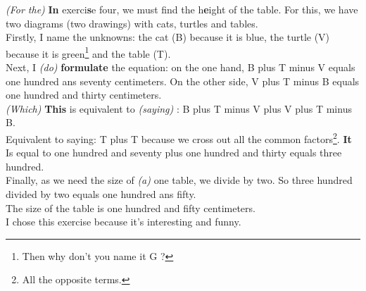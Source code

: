 \documentclass[12pt,a4paper,english,firamath]{nsi}
\begin{document}
\maketitle
\textit{(For the)} \textbf{In}  exerci\textbf{s}e four, we must find the h\textbf{e}ight of the table. For this, we have two diagrams (two drawings) with cats, turtles and tables.\\

Firstly, I name the unknowns: the cat (B) because it is blue, the turtle (V) because it is green\footnote{Then why don't you name it G ?} and the table (T).\\

Next, I \textit{(do)} \textbf{formulate} the equation: on the one hand, B plus T minus V equals one hundred ans seventy centimeters. On the other side, V plus T minus B equals one hundred and thirty centimeters.\\ 
\textit{(Which)} \textbf{This}  is equivalent to \textit{(saying)} : B plus T minus V plus V plus T minus B.\\ 
Equivalent to saying: T plus T because we cross out all the common factors\footnote{All the opposite terms.}. \textbf{It} Is equal to one hundred and seventy plus one hundred and thirty equals three hundred.\\

Finally, as we need the size of \textit{(a)} one table, we divide by two. So three hundred divided by two equals one hundred ans fifty.\\

The size of the table is one hundred and fifty centimeters.\\

I chose this exercise because it's interesting and funny.
\end{document}
